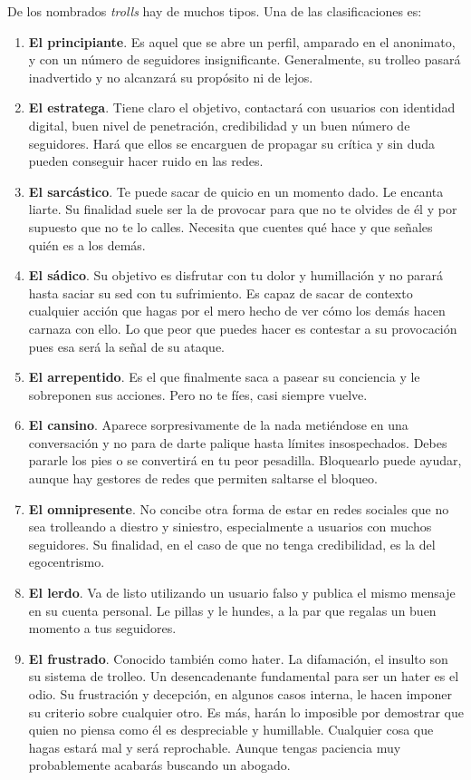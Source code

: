 \documentclass[../all.tex]{subfiles}
\begin{document}
    De los nombrados \textit{trolls} hay de muchos tipos. Una de las clasificaciones es:
    \begin{enumerate}[resume]
        \item \textbf{El principiante}. Es aquel que se abre un perfil, amparado en el anonimato, y con un número de seguidores insignificante. Generalmente, su trolleo pasará inadvertido y no alcanzará su propósito ni de lejos.
        \item \textbf{El estratega}. Tiene claro el objetivo, contactará con usuarios con identidad digital, buen nivel de penetración, credibilidad y un buen número de seguidores. Hará que ellos se encarguen de propagar su crítica y sin duda pueden conseguir hacer ruido en las redes.
        \item \textbf{El sarcástico}. Te puede sacar de quicio en un momento dado. Le encanta liarte. Su finalidad suele ser la de provocar para que no te olvides de él y por supuesto que no te lo calles. Necesita que cuentes qué hace y que señales quién es a los demás.
        \item \textbf{El sádico}. Su objetivo es disfrutar con tu dolor y humillación y no parará hasta saciar su sed con tu sufrimiento. Es capaz de sacar de contexto cualquier acción que hagas por el mero hecho de ver cómo los demás hacen carnaza con ello. Lo que peor que puedes hacer es contestar a su provocación pues esa será la señal de su ataque.
        \item \textbf{El arrepentido}. Es el que finalmente saca a pasear su conciencia y le sobreponen sus acciones. Pero no te fíes, casi siempre vuelve.
        \item \textbf{El cansino}. Aparece sorpresivamente de la nada metiéndose en una conversación y no para de darte palique hasta límites insospechados. Debes pararle los pies o se convertirá en tu peor pesadilla. Bloquearlo puede ayudar, aunque hay gestores de redes que permiten saltarse el bloqueo.
        \item \textbf{El omnipresente}. No concibe otra forma de estar en redes sociales que no sea trolleando a diestro y siniestro, especialmente a usuarios con muchos seguidores. Su finalidad, en el caso de que no tenga credibilidad, es la del egocentrismo.
        \item \textbf{El lerdo}. Va de listo utilizando un usuario falso y publica el mismo mensaje en su cuenta personal. Le pillas y le hundes, a la par que regalas un buen momento a tus seguidores.
        \item \textbf{El frustrado}. Conocido también como hater. La difamación, el insulto son su sistema de trolleo. Un desencadenante fundamental para ser un hater es el odio. Su frustración y decepción, en algunos casos interna, le hacen imponer su criterio sobre cualquier otro. Es más, harán lo imposible por demostrar que quien no piensa como él es despreciable y humillable. Cualquier cosa que hagas estará mal y será reprochable. Aunque tengas paciencia muy probablemente acabarás buscando un abogado.

\end{enumerate}
\end{document}
